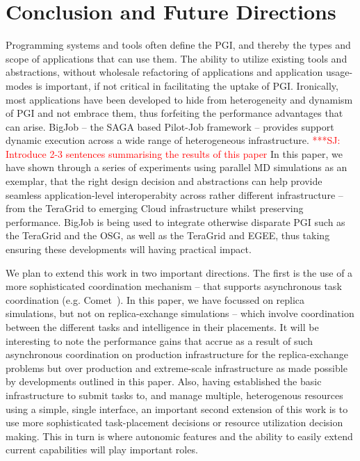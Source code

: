 \documentclass[conference,final]{IEEEtran}
\newcommand{\up}{\vspace*{-1em}}
\newcommand{\jhanote}[1]{ {\textcolor{red} { ***SJ: #1 }}}
\newcommand{\jhanote}[1]{}
\begin{document}
\section{Conclusion and Future Directions}
\up Programming systems and tools often define the PGI, and thereby
the types and scope of applications that can use them. The ability to
utilize existing tools and abstractions, without wholesale refactoring
of applications and application usage-modes is important, if not
critical in facilitating the uptake of PGI. Ironically, most
applications have been developed to hide from heterogeneity and
dynamism of PGI and not embrace them, thus forfeiting the performance
advantages that can arise. BigJob -- the SAGA based Pilot-Job
framework -- provides support dynamic execution across a wide range of
heterogeneous infrastructure.\jhanote{Introduce 2-3 sentences
  summarising the results of this paper} In this paper, we have shown
through a series of experiments using parallel MD simulations as an
exemplar, that the right design decision and abstractions can help
provide seamless application-level interoperabity across rather
different infrastructure -- from the TeraGrid to emerging Cloud
infrastructure whilst preserving performance.  BigJob is being used to
integrate otherwise disparate PGI such as the TeraGrid and the OSG, as
well as the TeraGrid and EGEE, thus taking ensuring these developments
will having practical impact.

We plan to extend this work in two important directions. The first is
the use of a more sophisticated coordination mechanism -- that
supports asynchronous task coordination
(e.g. Comet~\cite{comethpdc}). In this paper, we have focussed on
replica simulations, but not on replica-exchange simulations -- which
involve coordination between the different tasks and intelligence in
their placements.  It will be interesting to note the performance
gains that accrue as a result of such asynchronous coordination on
production infrastructure for the replica-exchange problems but over
production and extreme-scale infrastructure as made possible by
developments outlined in this paper. Also, having established the
basic infrastructure to submit tasks to, and manage multiple,
heterogenous resources using a simple, single interface, an important
second extension of this work is to use more sophisticated
task-placement decisions or resource utilization decision making.
This in turn is where autonomic features and the ability to easily
extend current capabilities will play important roles.
\end{document}
